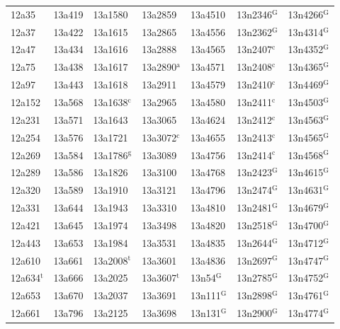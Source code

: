 \documentclass[12pt, oneside]{amsart}
\begin{document}
{\begin{longtable}{*{7}{>{\raggedright\arraybackslash}p{}}}
12a35 & 13a419 & 13a1580 & 13a2859 & 13a4510 & 13n2346$^{\mathrm{G}}$ & 13n4266$^{\mathrm{G}}$ \\
12a37 & 13a422 & 13a1615 & 13a2865 & 13a4556 & 13n2362$^{\mathrm{G}}$ & 13n4314$^{\mathrm{G}}$ \\
12a47 & 13a434 & 13a1616 & 13a2888 & 13a4565 & 13n2407$^{\mathrm{c}}$ & 13n4352$^{\mathrm{G}}$ \\
12a75 & 13a438 & 13a1617 & 13a2890$^{\mathrm{a}}$ & 13a4571 & 13n2408$^{\mathrm{c}}$ & 13n4365$^{\mathrm{G}}$ \\
12a97 & 13a443 & 13a1618 & 13a2911 & 13a4579 & 13n2410$^{\mathrm{c}}$ & 13n4469$^{\mathrm{G}}$ \\
12a152 & 13a568 & 13a1638$^{\mathrm{c}}$ & 13a2965 & 13a4580 & 13n2411$^{\mathrm{c}}$ & 13n4503$^{\mathrm{G}}$ \\
12a231 & 13a571 & 13a1643 & 13a3065 & 13a4624 & 13n2412$^{\mathrm{c}}$ & 13n4563$^{\mathrm{G}}$ \\
12a254 & 13a576 & 13a1721 & 13a3072$^{\mathrm{c}}$ & 13a4655 & 13n2413$^{\mathrm{c}}$ & 13n4565$^{\mathrm{G}}$ \\
12a269 & 13a584 & 13a1786$^{\mathrm{g}}$ & 13a3089 & 13a4756 & 13n2414$^{\mathrm{c}}$ & 13n4568$^{\mathrm{G}}$ \\
12a289 & 13a586 & 13a1826 & 13a3100 & 13a4768 & 13n2423$^{\mathrm{G}}$ & 13n4615$^{\mathrm{G}}$ \\
12a320 & 13a589 & 13a1910 & 13a3121 & 13a4796 & 13n2474$^{\mathrm{G}}$ & 13n4631$^{\mathrm{G}}$ \\
12a331 & 13a644 & 13a1943 & 13a3310 & 13a4810 & 13n2481$^{\mathrm{G}}$ & 13n4679$^{\mathrm{G}}$ \\
12a421 & 13a645 & 13a1974 & 13a3498 & 13a4820 & 13n2518$^{\mathrm{G}}$ & 13n4700$^{\mathrm{G}}$ \\
12a443 & 13a653 & 13a1984 & 13a3531 & 13a4835 & 13n2644$^{\mathrm{G}}$ & 13n4712$^{\mathrm{G}}$ \\
12a610 & 13a661 & 13a2008$^{\mathrm{t}}$ & 13a3601 & 13a4836 & 13n2697$^{\mathrm{G}}$ & 13n4747$^{\mathrm{G}}$ \\
12a634$^{\mathrm{t}}$ & 13a666 & 13a2025 & 13a3607$^{\mathrm{t}}$ & 13n54$^{\mathrm{G}}$ & 13n2785$^{\mathrm{G}}$ & 13n4752$^{\mathrm{G}}$ \\
12a653 & 13a670 & 13a2037 & 13a3691 & 13n111$^{\mathrm{G}}$ & 13n2898$^{\mathrm{G}}$ & 13n4761$^{\mathrm{G}}$ \\
12a661 & 13a796 & 13a2125 & 13a3698 & 13n131$^{\mathrm{G}}$ & 13n2900$^{\mathrm{G}}$ & 13n4774$^{\mathrm{G}}$ \\

\end{longtable}}
\end{document}
